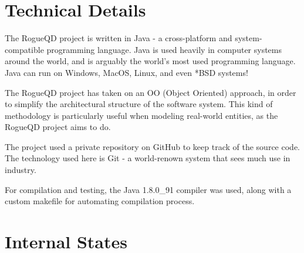 \documentclass{article}
\begin{document}

\section{Technical Details} %

	The RogueQD project is written in Java - a cross-platform and system-compatible programming language. Java is used heavily in computer systems around the world, and is arguably the world's most used programming language. Java can run on Windows, MacOS, Linux, and even *BSD systems!

	\bigskip

	The RogueQD project has taken on an OO (Object Oriented) approach, in order to simplify the architectural structure of the software system. This kind of methodology is particularly useful when modeling real-world entities, as the RogueQD project aims to do.

	\bigskip

	The project used a private repository on GitHub to keep track of the source code. The technology used here is Git - a world-renown system that sees much use in industry.

	\bigskip

	For compilation and testing, the Java 1.8.0\_91 compiler was used, along with a custom makefile for automating compilation process.


\section{Internal States} %
\label{sec:internal_states}

\end{document}
